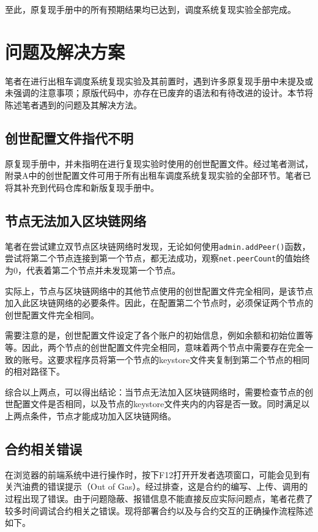 至此，原复现手册中的所有预期结果均已达到，调度系统复现实验全部完成。

\section{问题及解决方案}

笔者在进行出租车调度系统复现实验及其前置时，遇到许多原复现手册中未提及或未强调的注意事项；原版代码中，亦存在已废弃的语法和有待改进的设计。本节将陈述笔者遇到的问题及其解决方法。

\subsection{创世配置文件指代不明}

原复现手册中，并未指明在进行复现实验时使用的创世配置文件。经过笔者测试，附录A中的创世配置文件可用于所有出租车调度系统复现实验的全部环节。笔者已将其补充到代码仓库和新版复现手册中。

\subsection{节点无法加入区块链网络}

笔者在尝试建立双节点区块链网络时发现，无论如何使用\verb|admin.addPeer()|函数，尝试将第二个节点连接到第一个节点，都无法成功，观察\verb|net.peerCount|的值始终为0，代表着第二个节点并未发现第一个节点。

实际上，节点与区块链网络中的其他节点使用的创世配置文件完全相同，是该节点加入此区块链网络的必要条件。因此，在配置第二个节点时，必须保证两个节点的创世配置文件完全相同。

需要注意的是，创世配置文件设定了各个账户的初始信息，例如余额和初始位置等等。因此，两个节点的创世配置文件完全相同，意味着两个节点中需要存在完全一致的账号。这要求程序员将第一个节点的keystore文件夹复制到第二个节点的相同的相对路径下。

综合以上两点，可以得出结论：当节点无法加入区块链网络时，需要检查节点的创世配置文件是否相同，以及节点的keystore文件夹内的内容是否一致。同时满足以上两点条件，节点才能成功加入区块链网络。

\subsection{合约相关错误}

在浏览器的前端系统中进行操作时，按下F12打开开发者选项窗口，可能会见到有关汽油费的错误提示（Out of Gas）。经过排查，这是合约的编写、上传、调用的过程出现了错误。由于问题隐蔽、报错信息不能直接反应实际问题点，笔者花费了较多时间调试合约相关之错误。现将部署合约以及与合约交互的正确操作流程陈述如下。

